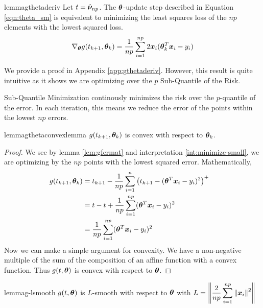 \documentclass{article} %
\newcommand{\norm}[1]{\left\lVert#1\right\rVert}
\begin{document}
	\begin{restatable}{lemma}{gthetaderiv}\label{lem:gthetaderiv}
		Let $t = \hat{{\bm{\nu}}}_{np}$. The ${\bm{\theta}}$-update step described in Equation \ref{eqn:theta_sm} is equivalent to minimizing the least squares loss of the $np$ elements with the lowest squared loss.
	   \begin{equation}
			\nabla_{{\bm{\theta}}}g(t_{k+1},{\bm{\theta}}_k) = \frac{1}{np}\sum_{i=1}^{np}2{\bm{x}}_i({\bm{\theta}}_k^T{\bm{x}}_i - y_i)
		\end{equation}
	\end{restatable}
	We provide a proof in Appendix \ref{app:gthetaderiv}. However, this result is quite intuitive as it shows we are optimizing over the $p$ Sub-Quantile of the Risk.
	\begin{interpretation}
		\label{int:minimize-small}
		Sub-Quantile Minimization continously minimizes the risk over the $p$-quantile of the error. In each iteration, this means we reduce the error of the points within the lowest $np$ errors.
	\end{interpretation}

		
	\begin{restatable}{lemma}{gthetaconvexlemma}
		\label{lem:gthetaconvex}
		$g(t_{k+1},{\bm{\theta}}_k)$ is convex with respect to ${\bm{\theta}}_k$.
	\end{restatable}
	\begin{proof}
		We see by lemma \ref{lem:gfermat} and interpretation \ref{int:minimize-small}, we are optimizing by the $np$ points with the lowest squared error. Mathematically, 
		\begin{align*}
			g(t_{k+1},{\bm{\theta}}_k) &= t_{k+1} - \frac{1}{np}\sum_{i=1}^{n}\left(t_{k+1} - ({\bm{\theta}}^T{\bm{x}}_i - y_i)^2\right)^+ &&\\
			&= t - t + \frac{1}{np}\sum_{i=1}^{np}({\bm{\theta}}^T{\bm{x}}_i - y_i)^2 &&\\
			&= \frac{1}{np}\sum_{i=1}^{np}({\bm{\theta}}^T{\bm{x}}_i - y_i)^2 &&
		\end{align*}
		Now we can make a simple argument for convexity. We have a non-negative multiple of the sum of the composition of an affine function with a convex function. Thus $g(t,{\bm{\theta}})$ is convex with respect to ${\bm{\theta}}$.
	\end{proof}
	
	\begin{restatable}{lemma}{g-lsmooth}
		\label{lem:g-lsmooth}
		$g(t,{\bm{\theta}})$ is $L$-smooth with respect to ${\bm{\theta}}$ with $\displaystyle L = \norm{\frac{2}{np}\sum_{i=1}^{np}\norm{\vx_i}^2}$ 
	\end{restatable}
	
\end{document}
